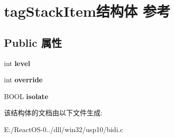 \hypertarget{structtag_stack_item}{}\section{tag\+Stack\+Item结构体 参考}
\label{structtag_stack_item}
\subsection*{Public 属性}
\begin{DoxyCompactItemize}
\item 
\mbox{\label{structtag_stack_item_a0e61cbc44ec8ff567a750a2147ef3152}} 
int {\bfseries level}
\item 
\mbox{\label{structtag_stack_item_a0d495f04a400a78bd72b038ad0ea6fc5}} 
int {\bfseries override}
\item 
\mbox{\label{structtag_stack_item_acc2b7baf0a59a06bd97a529eac60e414}} 
B\+O\+OL {\bfseries isolate}
\end{DoxyCompactItemize}


该结构体的文档由以下文件生成\+:\begin{DoxyCompactItemize}
\item 
E\+:/\+React\+O\+S-\/0../dll/win32/usp10/bidi.\+c\end{DoxyCompactItemize}
